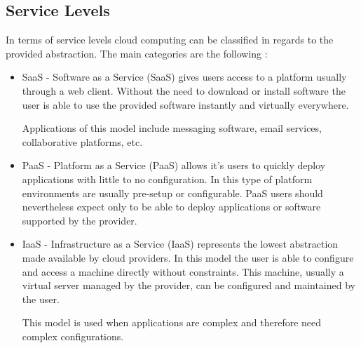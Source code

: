         \subsection{Service Levels} \label{chap:stateoftheheart:sec:cloud:sec:servicelevels}
			In terms of service levels cloud computing can be classified in regards to the provided abstraction. The main categories are the following \cite{Garrison2012,Zhang2010,Mell2011,Sampaio2011,Vaquero2008} :
			\begin{itemize}
				\item{SaaS} - Software as a Service (SaaS) gives users access to a platform usually through a web client. Without the need to  download or install software the user is able to use the provided software instantly and virtually everywhere. 
	    
    			Applications of this model include messaging software, email services, collaborative platforms, etc.  
	    
   				\item{PaaS} - Platform as a Service (PaaS) allows it's users to quickly deploy applications with little to no configuration. In this type of platform environments are usually pre-setup or configurable. PaaS users should nevertheless expect only to be able to deploy applications or software supported by the provider.
	    
	    
    			\item{IaaS} - Infrastructure as a Service (IaaS) represents the lowest abstraction made available by cloud providers. In this model the user is able to configure and access a machine directly without constraints. This machine, usually a virtual server managed by the provider, can be configured and maintained by the user.
	    
    		This model is used when applications are complex and therefore need complex configurations.

			\end{itemize}

